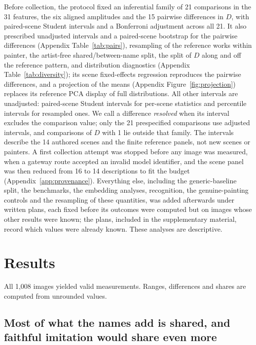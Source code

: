 \documentclass[10pt]{article}
\begin{document}
Before collection, the protocol fixed an inferential family of 21 comparisons in the 31 features,
the six aligned amplitudes and the 15 pairwise differences in $D$, with paired-scene Student
intervals and a Bonferroni adjustment across all 21. It also prescribed unadjusted intervals and a
paired-scene bootstrap for the pairwise differences (Appendix Table~\ref{tab:pairs}), resampling of
the reference works within painter, the artist-free shared/between-name split, the split of $D$
along and off the reference pattern, and distribution diagnostics (Appendix
Table~\ref{tab:diversity}); its scene fixed-effects regression reproduces the pairwise differences,
and a projection of the means (Appendix Figure~\ref{fig:projection}) replaces its reference PCA
display of full distributions. All other intervals are unadjusted: paired-scene Student intervals
for per-scene statistics and percentile intervals for resampled ones. We call a difference
\emph{resolved} when its interval excludes the comparison value; only the 21 prespecified
comparisons use adjusted intervals, and comparisons of $D$ with 1 lie outside that family. The
intervals describe the 14 authored scenes and the finite reference panels, not new scenes or
painters. A first collection attempt was stopped before any image was measured, when a gateway
route accepted an invalid model identifier, and the scene panel was then reduced from 16 to 14
descriptions to fit the budget (Appendix~\ref{app:provenance}). Everything else, including the
generic-baseline split, the benchmarks, the embedding analyses, recognition, the genuine-painting
controls and the resampling of these quantities, was added afterwards under written plans, each
fixed before its outcomes were computed but on images whose other results were known; the plans,
included in the supplementary material, record which values were already known. These analyses are
descriptive.

\section{Results}\label{sec:results}

All 1,008 images yielded valid measurements. Ranges, differences and shares are computed from
unrounded values.

\subsection{Most of what the names add is shared, and faithful imitation would share even more}\label{sec:shared}
\end{document}
